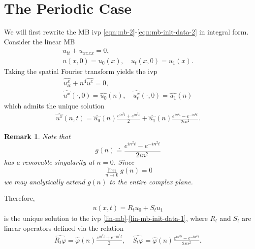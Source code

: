 \documentclass[12pt,reqno]{amsart}
\numberwithin{equation}{section}  %
\numberwithin{figure}{section}
\newcommand{\wh}{\widehat}
\newcommand{\vp}{\varphi}
\newtheorem{remark}[theorem]{Remark}
\begin{document}
%
%
%
%
%
%
%
%
\section{The Periodic Case} 
\label{sec:periodic-case}
We will first rewrite the MB ivp
\eqref{eqn:mb-2}-\eqref{eqn:mb-init-data-2} in integral form. Consider
the linear MB
\begin{gather}
  u_{tt} + u_{xxxx} = 0,
  \label{lin-mb}
  \\
  u(x, 0)=u_{0}(x), \quad u_{t}(x,0) = u_{1}(x).
  \label{lin-mb-init-data-1}
\end{gather}
Taking the spatial Fourier transform yields the ivp
\begin{gather*}
  \wh{u_{tt}^{x}} + n^{4} \wh{u^{x}} = 0,
  \\
  \wh{u^{x}}(\cdot, 0) = \wh{u_{0}}(n), \quad
  \wh{u_{t}^{x}}(\cdot, 0) = \wh{u_{1}}(n)
\end{gather*}
which admits the unique solution
%
%
\begin{equation*}
  \begin{split}
    \wh{u^{x}}(n, t) = \wh{u_{0}}(n) \frac{e^{in^{2}t} + e^{in^{2}t}}{2} + 
    \wh{u_{1}}(n) \frac{e^{in^{2}t} - e^{-in^{2}t}}{2i n^{2}}.
  \end{split}
\end{equation*}
%
%
%
%
\begin{framed}
\begin{remark}
  Note that $$g(n) \doteq \frac{e^{in^{2}t} - e^{-in^{2}t}}{2i n^{2}}$$ has a removable
  singularity at $n=0$. Since $$\lim_{n \to 0} g(n) = 0$$ we may analytically
  extend $g(n)$ to the entire complex plane. 
\label{rem:analytic-extension}
\end{remark}
\end{framed}
%
%
%
Therefore,
%
%
\begin{equation*}
  \begin{split}
    u(x,t) = R_t u_{0} + S_{t}u_{1}
  \end{split}
\end{equation*}
%
is the unique solution to the ivp
\eqref{lin-mb}-\eqref{lin-mb-init-data-1}, where $R_{t}$ and $S_{t}$ are linear operators defined via the relation
%
%
\begin{gather*}
  \wh{R_{t}\vp} = \wh{\vp}(n) \frac{e^{in^{2}t} + e^{-in^{2}t}}{2} , \quad 
  \wh{S_{t}\vp} = \wh{\vp}(n) \frac{e^{in^{2}t} - e^{-in^{2}t}}{2i n^{2}}.
\end{gather*}
\end{document}
